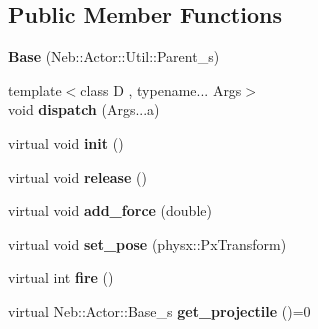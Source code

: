 \subsection*{\-Public \-Member \-Functions}
\begin{DoxyCompactItemize}
\item 
\hypertarget{classNeb_1_1Actor_1_1Actor_1_1Base_ac0c10d0555dc9d5e4bcc07f8159720df}{{\bfseries \-Base} (\-Neb\-::\-Actor\-::\-Util\-::\-Parent\-\_\-s)}\label{classNeb_1_1Actor_1_1Actor_1_1Base_ac0c10d0555dc9d5e4bcc07f8159720df}

\item 
\hypertarget{classNeb_1_1Actor_1_1Actor_1_1Base_a2fe69d97551c10e6e6f8074888ec7df5}{{\footnotesize template$<$class D , typename... \-Args$>$ }\\void {\bfseries dispatch} (\-Args...\-a)}\label{classNeb_1_1Actor_1_1Actor_1_1Base_a2fe69d97551c10e6e6f8074888ec7df5}

\item 
\hypertarget{classNeb_1_1Actor_1_1Actor_1_1Base_a7f201d00542be0ed93b510cc122ba16e}{virtual void {\bfseries init} ()}\label{classNeb_1_1Actor_1_1Actor_1_1Base_a7f201d00542be0ed93b510cc122ba16e}

\item 
\hypertarget{classNeb_1_1Actor_1_1Actor_1_1Base_abbffba628fe1e1203ba2d68afc631e61}{virtual void {\bfseries release} ()}\label{classNeb_1_1Actor_1_1Actor_1_1Base_abbffba628fe1e1203ba2d68afc631e61}

\item 
\hypertarget{classNeb_1_1Actor_1_1Actor_1_1Base_a08e75988b2a5bb8dbcc279fce4d0c11d}{virtual void {\bfseries add\-\_\-force} (double)}\label{classNeb_1_1Actor_1_1Actor_1_1Base_a08e75988b2a5bb8dbcc279fce4d0c11d}

\item 
\hypertarget{classNeb_1_1Actor_1_1Actor_1_1Base_a6547798757227642aa1089a696a33877}{virtual void {\bfseries set\-\_\-pose} (physx\-::\-Px\-Transform)}\label{classNeb_1_1Actor_1_1Actor_1_1Base_a6547798757227642aa1089a696a33877}

\item 
\hypertarget{classNeb_1_1Actor_1_1Actor_1_1Base_a5a79d896b4c3b2be4ad2547984f5344d}{virtual int {\bfseries fire} ()}\label{classNeb_1_1Actor_1_1Actor_1_1Base_a5a79d896b4c3b2be4ad2547984f5344d}

\item 
\hypertarget{classNeb_1_1Actor_1_1Actor_1_1Base_a511a68cc306ce9e0b3417aa310eeae4f}{virtual \-Neb\-::\-Actor\-::\-Base\-\_\-s {\bfseries get\-\_\-projectile} ()=0}\label{classNeb_1_1Actor_1_1Actor_1_1Base_a511a68cc306ce9e0b3417aa310eeae4f}


\end{DoxyCompactItemize}
